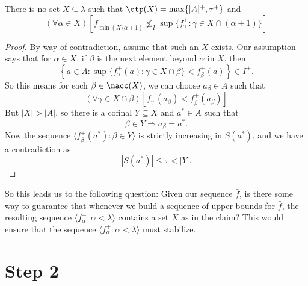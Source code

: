 \begin{claim}
There is no set $X\subseteq\lambda$ such that $\otp(X)=\max\{|A|^+,\tau^+\}$ and
\begin{equation}
(\forall\alpha\in X)\left[ f^+_{\min(X\setminus \alpha+1)}\nleq_I \sup\{f^+_\gamma:\gamma\in X\cap(\alpha+1)\}\right]
\end{equation}
\end{claim}
\begin{proof}
By way of contradiction, assume that such an $X$ exists.  Our assumption says that for $\alpha\in X$, if $\beta$ is the next
element beyond $\alpha$ in $X$, then
\begin{equation}
\left\{a\in A: \sup\{f^+_\gamma(a):\gamma\in X\cap\beta\}<f^+_\beta(a)\right\}\in I^+.
\end{equation}
So this means for each $\beta\in \nacc(X)$, we can choose $a_\beta\in A$ such that
\begin{equation}
(\forall \gamma\in X\cap\beta)\left[ f^+_\gamma(a_\beta)<f^+_\beta(a_\beta)\right]
\end{equation}
But $|X|>|A|$, so there is a cofinal $Y\subseteq X$ and $a^*\in A$ such that
\begin{equation}
\beta\in Y\Longrightarrow a_\beta = a^*.
\end{equation}
Now the sequence $\langle f^+_\beta(a^*):\beta\in Y\rangle$ is strictly increasing in $S(a^*)$, and we have a contradiction as
\begin{equation}
|S(a^*)|\leq \tau < |Y|.
\end{equation}
\end{proof}

So this leads us to the following question:  Given our sequence $\bar{f}$, is there some way to guarantee that whenever we build
a sequence of upper bounds for $\bar{f}$, the resulting sequence $\langle f^+_\alpha:\alpha<\lambda\rangle$ contains a set $X$ as
in the claim?  This would ensure that the sequence $\langle f^+_\alpha:\alpha<\lambda\rangle$ must stabilize.


\section{Step 2}

